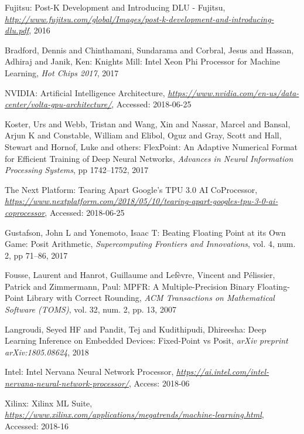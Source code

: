 \documentclass[techrep,english]{ipsj} %
\begin{document}
{\begin{thebibliography}{99}
  Fujitsu:
  Post-K Development and Introducing DLU - Fujitsu,
  {\it \url{http://www.fujitsu.com/global/Images/post-k-development-and-introducing-dlu.pdf}},
  2016

  Bradford, Dennis and Chinthamani, Sundarama and Corbral, Jesus and Hassan, Adhiraj and Janik, Ken:
  Knights Mill: Intel Xeon Phi Processor for Machine Learning,
  {\it Hot Chips 2017},
  2017
  
  NVIDIA:
  Artificial Intelligence Architecture,
  {\it \url{https://www.nvidia.com/en-us/data-center/volta-gpu-architecture/}},
  Accessed: 2018-06-25

  Koster, Urs and Webb, Tristan and Wang, Xin and Nassar, Marcel and Bansal, Arjun K and Constable, William and Elibol, Oguz and Gray, Scott and Hall, Stewart and Hornof, Luke and others:
  FlexPoint: An Adaptive Numerical Format for Efficient Training of Deep Neural Networks,
  {\it Advances in Neural Information Processing Systems},
  pp 1742--1752, 2017

  The Next Platform:
  Tearing Apart Google’s TPU 3.0 AI CoProcessor,
  {\it \url{https://www.nextplatform.com/2018/05/10/tearing-apart-googles-tpu-3-0-ai-coprocessor}},
  Accessed: 2018-06-25
    
  Gustafson, John L and Yonemoto, Isaac T:
  Beating Floating Point at its Own Game: Posit Arithmetic,
  {\it Supercomputing Frontiers and Innovations},
  vol. 4, num. 2, pp 71--86, 2017

  Fousse, Laurent and Hanrot, Guillaume and Lef{\`e}vre, Vincent and P{\'e}lissier, Patrick and Zimmermann, Paul:
  MPFR: A Multiple-Precision Binary Floating-Point Library with Correct Rounding,
  {\it ACM Transactions on Mathematical Software (TOMS)},
  vol. 32, num. 2, pp. 13, 2007


  Langroudi, Seyed HF and Pandit, Tej and Kudithipudi, Dhireesha:
  Deep Learning Inference on Embedded Devices: Fixed-Point vs Posit,
  {\it arXiv preprint arXiv:1805.08624},
  2018

  Intel:
  Intel Nervana Neural Network Processor,
  {\it \url{https://ai.intel.com/intel-nervana-neural-network-processor/}},
  Access: 2018-06

  Xilinx:
  Xilinx ML Suite,
  {\it \url{https://www.xilinx.com/applications/megatrends/machine-learning.html}},
  Accessed: 2018-16


\end{thebibliography}}
\end{document}
